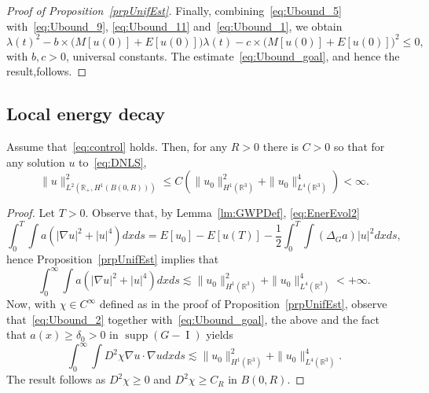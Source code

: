\documentclass[10pt]{amsart}
\theoremstyle{definition}\newtheorem{defi}[theo]{Definition}\newtheorem{rema}[theo]{Remark}\newtheorem{exam}[theo]{Example}\newtheorem{exem}[theo]{Example}\newtheorem{nota}[theo]{Notation}
\newcommand*\R{\mathbb{R}}
\DeclareMathOperator{\I}{I}
\DeclareMathOperator{\supp}{supp}
\begin{document}
\begin{proof}[Proof of Proposition~\ref{prpUnifEst}]
Finally, combining~\eqref{eq:Ubound_5} with~\eqref{eq:Ubound_9}, \eqref{eq:Ubound_11} and~\eqref{eq:Ubound_1}, we obtain
\[
\lambda(t)^2 - b \times \bigl(M[u(0)] + E[u(0)]\bigr) \lambda(t) - c \times \bigl(M[u(0)] + E[u(0)]\bigr)^2 \leq 0,
\]
with $b, c>0$, universal constants. The estimate~\eqref{eq:Ubound_goal}, and hence the result,\linebreak follows.
\end{proof}

\subsection{Local energy decay} \label{ss:loc_dec}

\begin{coro} \label{cor:Ubound1}
Assume that~\eqref{eq:control} holds. Then, for any $R>0$ there is $C>0$ so that for any solution $u$ to~\eqref{eq:DNLS},
\begin{equation}\label{eq:L2H1LocDec}
\| u \|^2_{L^2\left(\R_+, H^1(B(0,R))\right)} \leq C\left(\| u_0 \|_{H^1(\R^3)}^2 + \| u_0 \|_{L^4(\R^3)}^4\right) < \infty.
\end{equation}
\end{coro}
\begin{proof}
Let $T>0$. Observe that, by Lemma~\ref{lm:GWPDef}, \eqref{eq:EnerEvol2}
\[
\int_0^T \int a\left(|\nabla u|^2 + |u|^{4}\right) dx ds = E[u_0] - E[u(T)] - \frac{1}{2} \int_0^T \int (\Delta_G a) |u|^2 dx ds,
\]
hence Proposition~\ref{prpUnifEst} implies that
\[
\int_0^\infty \int a\left(|\nabla u|^2 + |u|^{4}\right) dx ds
\lesssim \| u_0 \|_{H^1(\R^3)}^2 + \| u_0 \|_{L^4(\R^3)}^4 < +\infty.
\]
Now, with $\chi \in C^\infty$ defined as in the proof of Proposition~\ref{prpUnifEst}, observe that~\eqref{eq:Ubound_2} together with~\eqref{eq:Ubound_goal}, the above and the fact that $a(x) \geq \delta_0 > 0$ in $\supp(G-\I )$ yields
\[
\int_0^\infty \int D^2 \chi \nabla u \cdot \nabla u dx ds
\lesssim \| u_0 \|_{H^1(\R^3)}^2 + \| u_0 \|_{L^4(\R^3)}^4.
\]
The result follows as $D^2 \chi \geq 0$ and $D^2 \chi \geq C_R$ in $B(0,R)$.
\end{proof}
\end{document}
